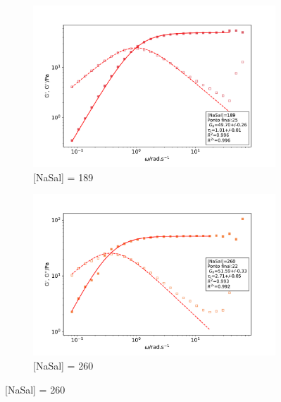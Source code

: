 		\begin{figure}[h]
			\begin{subfigure}[t]{0.5\textwidth}
				\centering
				\includegraphics[width=\textwidth]{imagens/reologia/oscilatorio_agua_189}
				\caption{[NaSal] = 189\mM}
				\label{fig:oscilatorio_agua_189}
			\end{subfigure} %
			\begin{subfigure}[t]{0.5\textwidth}
				\includegraphics[width=\textwidth]{imagens/reologia/oscilatorio_agua_260}
				\caption{[NaSal] = 260\mM}
				\label{fig:oscilatorio_agua_260}
			\end{subfigure}
	

\end{figure}
